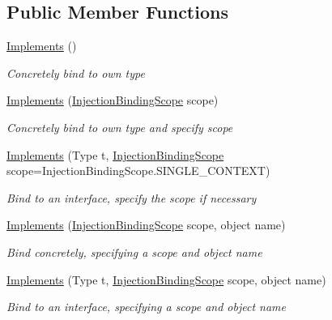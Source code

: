 \subsection*{Public Member Functions}
\begin{DoxyCompactItemize}
\item 
\hyperlink{class_implements_a6e3529d2c8c1f93d5b7b4ec8f60a6fe1}{Implements} ()
\begin{DoxyCompactList}\small\item\em Concretely bind to own type \end{DoxyCompactList}\item 
\hyperlink{class_implements_aafd25a3b73259d3cb009c3cb22da6560}{Implements} (\hyperlink{namespacestrange_1_1extensions_1_1injector_1_1api_ab0f6d151014ae36671ff9f98e77fbf58}{Injection\-Binding\-Scope} scope)
\begin{DoxyCompactList}\small\item\em Concretely bind to own type and specify scope \end{DoxyCompactList}\item 
\hyperlink{class_implements_ae79da61e363f451be47e764a33a17edc}{Implements} (Type t, \hyperlink{namespacestrange_1_1extensions_1_1injector_1_1api_ab0f6d151014ae36671ff9f98e77fbf58}{Injection\-Binding\-Scope} scope=Injection\-Binding\-Scope.\-S\-I\-N\-G\-L\-E\-\_\-\-C\-O\-N\-T\-E\-X\-T)
\begin{DoxyCompactList}\small\item\em Bind to an interface, specify the scope if necessary \end{DoxyCompactList}\item 
\hyperlink{class_implements_a79b12c07fa1e4428bd8f3cdd49f76505}{Implements} (\hyperlink{namespacestrange_1_1extensions_1_1injector_1_1api_ab0f6d151014ae36671ff9f98e77fbf58}{Injection\-Binding\-Scope} scope, object name)
\begin{DoxyCompactList}\small\item\em Bind concretely, specifying a scope and object name \end{DoxyCompactList}\item 
\hyperlink{class_implements_a20fe3e4d0e47439a7187743e6b90352a}{Implements} (Type t, \hyperlink{namespacestrange_1_1extensions_1_1injector_1_1api_ab0f6d151014ae36671ff9f98e77fbf58}{Injection\-Binding\-Scope} scope, object name)
\begin{DoxyCompactList}\small\item\em Bind to an interface, specifying a scope and object name \end{DoxyCompactList}\end{DoxyCompactItemize}
